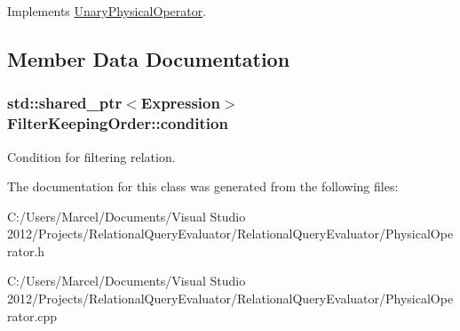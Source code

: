 Implements \hyperlink{class_unary_physical_operator_a3b0160d380149213561ef2ba479dbf6a}{Unary\+Physical\+Operator}.



\subsection{Member Data Documentation}
\hypertarget{class_filter_keeping_order_a9958c9755be1bcd46a9fa67116d07e67}{
\subsubsection[{condition}]{\setlength{\rightskip}{0pt plus 5cm}std\+::shared\+\_\+ptr$<${\bf Expression}$>$ Filter\+Keeping\+Order\+::condition}}\label{class_filter_keeping_order_a9958c9755be1bcd46a9fa67116d07e67}
Condition for filtering relation. 

The documentation for this class was generated from the following files\+:\begin{DoxyCompactItemize}
\item 
C\+:/\+Users/\+Marcel/\+Documents/\+Visual Studio 2012/\+Projects/\+Relational\+Query\+Evaluator/\+Relational\+Query\+Evaluator/Physical\+Operator.\+h\item 
C\+:/\+Users/\+Marcel/\+Documents/\+Visual Studio 2012/\+Projects/\+Relational\+Query\+Evaluator/\+Relational\+Query\+Evaluator/Physical\+Operator.\+cpp\end{DoxyCompactItemize}
